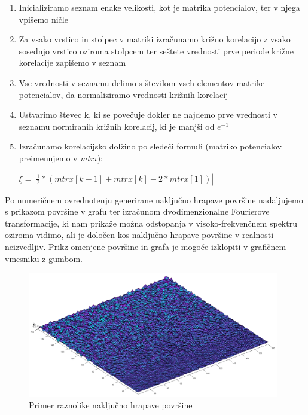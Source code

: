 \documentclass[a4paper,twoside,openright,12pt,slovene]{book}
\begin{document}
\begin{enumerate}
    \setlength\itemsep{0.1em}
    \item Inicializiramo seznam enake velikosti, kot je matrika potencialov, ter v njega vpišemo ničle 
    \item Za vsako vrstico in stolpec v matriki izračunamo križno korelacijo z vsako sosednjo vrstico oziroma stolpcem ter seštete vrednosti prve periode križne korelacije zapišemo v seznam
    \item Vse vrednosti v seznamu delimo s številom vseh elementov matrike potencialov, da normaliziramo vrednosti križnih korelacij
    \item Ustvarimo števec k, ki se povečuje dokler ne najdemo prve vrednosti v seznamu normiranih križnih korelacij, ki je manjši od $e^{-1}$
    \item Izračunamo korelacijsko dolžino po sledeči formuli (matriko potencialov preimenujemo v \textit{mtrx}):\\
    
    \begin{center}
        $\xi = \left| \frac{1}{2} * ( mtrx[k-1] + mtrx[k] - 2 * mtrx[1]) \right|$ \ \ \ \ \ \ \ \ \ \ \ \ \cite{mysimlabs_cl} \cite{gwydion_cl}
    \end{center} 
    
\end{enumerate}

Po numeričnem ovrednotenju generirane naključno hrapave površine nadaljujemo s prikazom površine v grafu ter izračunom dvodimenzionalne Fourierove transformacije, ki nam prikaže možna odstopanja v visoko-frekvenčnem spektru oziroma vidimo, ali je določen kos naključno hrapave površine v realnosti neizvedljiv. Prikz omenjene površine in grafa je mogoče izklopiti v grafičnem vmesniku z gumbom.\\

\begin{figure}[H]
    \centering
    \includegraphics[width=110mm]{Slike/Noise texture.png}
    \caption{Primer raznolike naključno hrapave površine}
    \label{fig:nanohrapavaPovršina}
\end{figure}
\end{document}
